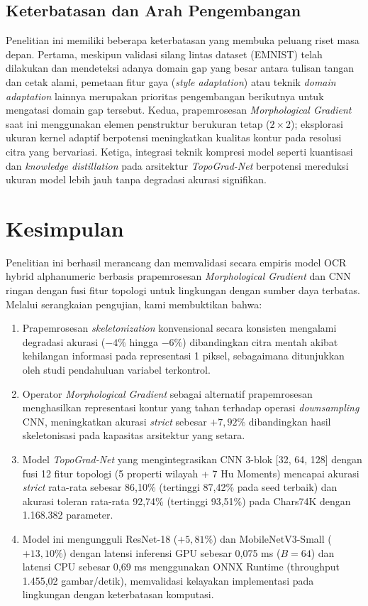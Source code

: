 \documentclass[journal]{IEEEtran}
\begin{document}
\subsection{Keterbatasan dan Arah Pengembangan}
Penelitian ini memiliki beberapa keterbatasan yang membuka peluang riset masa depan. Pertama, meskipun validasi silang lintas dataset (EMNIST) telah dilakukan dan mendeteksi adanya domain gap yang besar antara tulisan tangan dan cetak alami, pemetaan fitur gaya (\textit{style adaptation}) atau teknik \textit{domain adaptation} lainnya merupakan prioritas pengembangan berikutnya untuk mengatasi domain gap tersebut. Kedua, prapemrosesan \textit{Morphological Gradient} saat ini menggunakan elemen penstruktur berukuran tetap ($2 \times 2$); eksplorasi ukuran kernel adaptif berpotensi meningkatkan kualitas kontur pada resolusi citra yang bervariasi. Ketiga, integrasi teknik kompresi model seperti kuantisasi dan \textit{knowledge distillation} pada arsitektur \textit{TopoGrad-Net} berpotensi mereduksi ukuran model lebih jauh tanpa degradasi akurasi signifikan.

\section{Kesimpulan}
\label{sec:kesimpulan}
Penelitian ini berhasil merancang dan memvalidasi secara empiris model OCR hybrid alphanumeric berbasis prapemrosesan \textit{Morphological Gradient} dan CNN ringan dengan fusi fitur topologi untuk lingkungan dengan sumber daya terbatas. Melalui serangkaian pengujian, kami membuktikan bahwa:
\begin{enumerate}
    \item Prapemrosesan \textit{skeletonization} konvensional secara konsisten mengalami degradasi akurasi ($-4\%$ hingga $-6\%$) dibandingkan citra mentah akibat kehilangan informasi pada representasi 1 piksel, sebagaimana ditunjukkan oleh studi pendahuluan variabel terkontrol.
    \item Operator \textit{Morphological Gradient} sebagai alternatif prapemrosesan menghasilkan representasi kontur yang tahan terhadap operasi \textit{downsampling} CNN, meningkatkan akurasi \textit{strict} sebesar $+7{,}92\%$ dibandingkan hasil skeletonisasi pada kapasitas arsitektur yang setara.
    \item Model \textit{TopoGrad-Net} yang mengintegrasikan CNN 3-blok [32, 64, 128] dengan fusi 12 fitur topologi (5 properti wilayah + 7 Hu Moments) mencapai akurasi \textit{strict} rata-rata sebesar 86,10\% (tertinggi 87,42\% pada seed terbaik) dan akurasi toleran rata-rata 92,74\% (tertinggi 93,51\%) pada Chars74K dengan 1.168.382 parameter.
    \item Model ini mengungguli ResNet-18 ($+5{,}81\%$) dan MobileNetV3-Small ($+13{,}10\%$) dengan latensi inferensi GPU sebesar 0,075 ms ($B=64$) dan latensi CPU sebesar 0,69 ms menggunakan ONNX Runtime (throughput 1.455,02 gambar/detik), memvalidasi kelayakan implementasi pada lingkungan dengan keterbatasan komputasi.
\end{enumerate}
\end{document}
